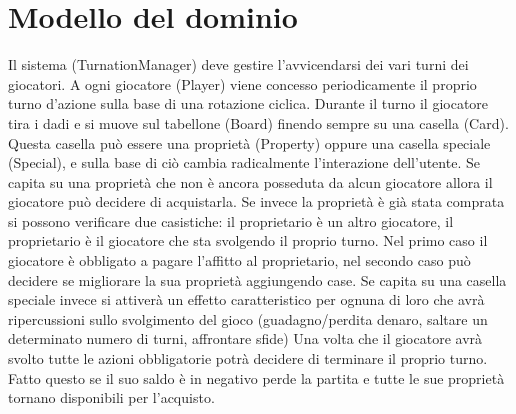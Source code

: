 \section{Modello del dominio}
Il sistema (TurnationManager) deve gestire l’avvicendarsi dei vari turni dei giocatori. 
A ogni giocatore (Player) viene concesso periodicamente il proprio turno d’azione sulla base di una rotazione ciclica. 
Durante il turno il giocatore tira i dadi e si muove sul tabellone (Board) finendo sempre su una casella (Card).
Questa casella può essere una proprietà (Property) oppure una casella speciale (Special), 
e sulla base di ciò cambia radicalmente l’interazione dell’utente. 
Se capita su una proprietà che non è ancora posseduta da alcun giocatore allora 
il giocatore può decidere di acquistarla. 
Se invece la proprietà è già stata comprata si possono verificare due casistiche: il proprietario è un 
altro giocatore, il proprietario è il giocatore che sta svolgendo il proprio turno. 
Nel primo caso il giocatore è obbligato a pagare l’affitto al proprietario, 
nel secondo caso può decidere se migliorare la sua proprietà aggiungendo case.
Se capita su una casella speciale invece si attiverà un effetto caratteristico 
per ognuna di loro che avrà ripercussioni sullo svolgimento del gioco 
(guadagno/perdita denaro, saltare un determinato numero di turni, affrontare sfide)
Una volta che il giocatore avrà svolto tutte le azioni obbligatorie potrà decidere di terminare il proprio turno. 
Fatto questo se il suo saldo è in negativo perde la partita e tutte le sue proprietà tornano disponibili per l’acquisto. 
